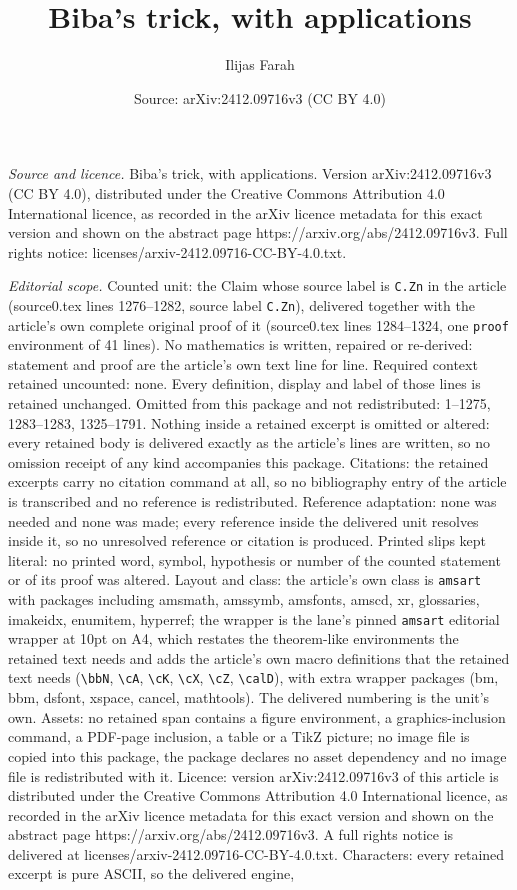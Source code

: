 \documentclass[10pt,a4paper]{amsart}
\title[Biba's trick, with applications]{Biba's trick, with applications}
\author{Ilijas Farah}
\date{Source: arXiv:2412.09716v3 (CC BY 4.0)}
\begin{document}
\maketitle

\noindent\emph{Source and licence.} Biba's trick, with applications. Version arXiv:2412.09716v3 (CC BY 4.0), distributed under the Creative Commons Attribution 4.0 International licence, as recorded in the arXiv licence metadata for this exact version and shown on the abstract page https://arxiv.org/abs/2412.09716v3. Full rights notice: licenses/arxiv-2412.09716-CC-BY-4.0.txt.\par\smallskip

\noindent\textit{Editorial scope.} Counted unit: the Claim whose source label is \texttt{C.Zn} in the article (source0.tex lines 1276--1282, source label \texttt{C.Zn}), delivered together with the article's own complete original proof of it (source0.tex lines 1284--1324, one \texttt{proof} environment of 41 lines). No mathematics is written, repaired or re-derived: statement and proof are the article's own text line for line. Required context retained uncounted: none. Every definition, display and label of those lines is retained unchanged. Omitted from this package and not redistributed: 1--1275, 1283--1283, 1325--1791. Nothing inside a retained excerpt is omitted or altered: every retained body is delivered exactly as the article's lines are written, so no omission receipt of any kind accompanies this package. Citations: the retained excerpts carry no citation command at all, so no bibliography entry of the article is transcribed and no reference is redistributed. Reference adaptation: none was needed and none was made; every reference inside the delivered unit resolves inside it, so no unresolved reference or citation is produced. Printed slips kept literal: no printed word, symbol, hypothesis or number of the counted statement or of its proof was altered. Layout and class: the article's own class is \texttt{amsart} with packages including amsmath, amssymb, amsfonts, amscd, xr, glossaries, imakeidx, enumitem, hyperref; the wrapper is the lane's pinned \texttt{amsart} editorial wrapper at 10pt on A4, which restates the theorem-like environments the retained text needs and adds the article's own macro definitions that the retained text needs (\texttt{\textbackslash bbN}, \texttt{\textbackslash cA}, \texttt{\textbackslash cK}, \texttt{\textbackslash cX}, \texttt{\textbackslash cZ}, \texttt{\textbackslash calD}), with extra wrapper packages (bm, bbm, dsfont, xspace, cancel, mathtools). The delivered numbering is the unit's own. Assets: no retained span contains a figure environment, a graphics-inclusion command, a PDF-page inclusion, a table or a TikZ picture; no image file is copied into this package, the package declares no asset dependency and no image file is redistributed with it. Licence: version arXiv:2412.09716v3 of this article is distributed under the Creative Commons Attribution 4.0 International licence, as recorded in the arXiv licence metadata for this exact version and shown on the abstract page https://arxiv.org/abs/2412.09716v3. A full rights notice is delivered at licenses/arxiv-2412.09716-CC-BY-4.0.txt. Characters: every retained excerpt is pure ASCII, so the delivered engine, 
\end{document}
